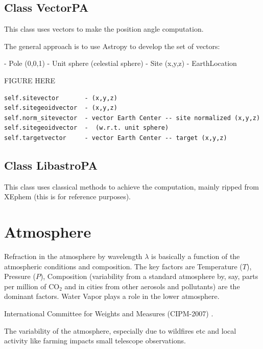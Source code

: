 \documentclass[letter,11pt,oneside]{article}
\begin{document}
\subsection{Class VectorPA}

This class uses vectors to make the position angle computation.

The general approach is to use Astropy to develop the set
of vectors:

- Pole (0,0,1) - Unit sphere (celestial sphere)
- Site (x,y,z) - EarthLocation

FIGURE HERE

\begingroup \fontsize{10pt}{10pt}
\selectfont
\begin{verbatim} 
self.sitevector       - (x,y,z)
self.sitegeoidvector  - (x,y,z)
self.norm_sitevector  - vector Earth Center -- site normalized (x,y,z)
self.sitegeoidvector  -  (w.r.t. unit sphere)
self.targetvector     - vector Earth Center -- target (x,y,z)
\end{verbatim}
\endgroup


\subsection{Class LibastroPA}

This class uses classical methods to achieve the computation,
mainly ripped from XEphem (this is for reference purposes).

\section{Atmosphere}

Refraction in the atmosphere by wavelength $\lambda$ is basically
a function of the atmospheric conditions and composition. The key
factors are Temperature ($T$), Pressure ($P$), Composition (variability
from a standard atmosphere by, say, parts per million of CO$_{2}$ and
in cities from other aerosols and pollutants) are the dominant
factors. Water Vapor plays a role in the lower atmosphere.

International Committee for Weights and Measures (CIPM-2007) \cite{CIPM-2007}.

The variability of the atmosphere, especially due to wildfires etc and
local activity like farming impacts small telescope observations.
\end{document}
